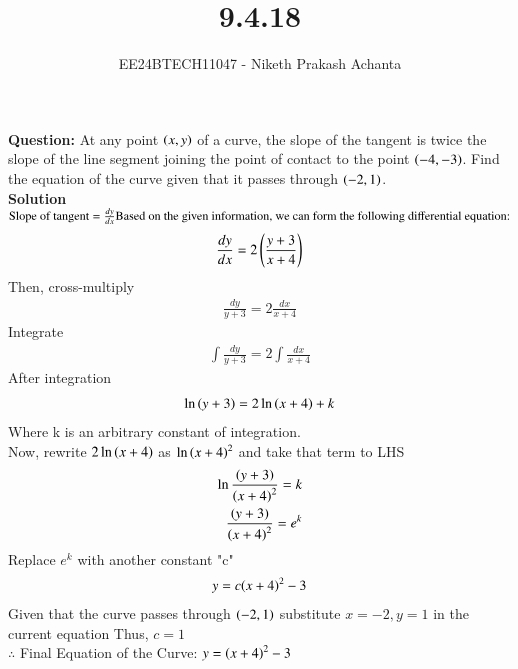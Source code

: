 \documentclass[journal]{IEEEtran}
\renewcommand{\thefigure}{\theenumi}
\renewcommand{\thetable}{\theenumi}
\numberwithin{equation}{enumi}
\numberwithin{figure}{enumi}
\renewcommand{\thetable}{\theenumi}
\begin{document}

\vspace{3cm}

\title{9.4.18}
\author{EE24BTECH11047 - Niketh Prakash Achanta}
{\let\newpage\relax\maketitle}
\renewcommand{\thefigure}{\theenumi}
\renewcommand{\thetable}{\theenumi}
\textbf{Question:} At any point $\left(x,y\right)$ of a curve, the slope of the tangent is twice the slope of the line segment joining the point of contact to the point $\left(-4,-3\right)$. Find the equation of the curve given that it passes through $\left(-2,1\right)$.\\

\textbf{Solution}\\
    $\text{Slope of tangent} = \frac{dy}{dx}\\ 
    \text{Based on the given information, we can form the following differential equation:}$ \\
    \begin{align}
    \frac{dy}{dx}=2\left(\frac{y+3}{x+4}\right)     
    \end{align}
Then, cross-multiply 
    \begin{align}
        \frac{dy}{y+3}=2\frac{dx}{x+4}
    \end{align}
Integrate
    \begin{align}
        \int{\frac{dy}{y+3}}=2\int{\frac{dx}{x+4}}
    \end{align}
After integration
    \begin{align}
        \ln{\ensuremath{\left(y+3\right)}}=2\ln{\ensuremath{\left(x+4\right)}}+k    
    \end{align}
Where k is an arbitrary constant of integration.\\
Now, rewrite $2\ln{\ensuremath{\left(x+4\right)}}$ as ${\ln{\ensuremath{\left(x+4\right)}}}^2$ and take that term to LHS
    \begin{align}
        \ln{\frac{\ensuremath{\left(y+3\right)}}{{\ensuremath{\left(x+4\right)}}^2}}=k\\
        \frac{\left(y+3\right)}{{\left(x+4\right)}^2}={e}^k
    \end{align}
Replace $e^k$ with another constant "c"
    \begin{align}
        y=c{\left(x+4\right)}^2 - 3
    \end{align}
Given that the curve passes through $\left(-2,1\right)$ substitute $x=-2,y=1$ in the current equation
Thus, $c=1$\\
$\therefore$ Final Equation of the Curve: $y={\left(x+4\right)}^2 - 3$
\end{document}
